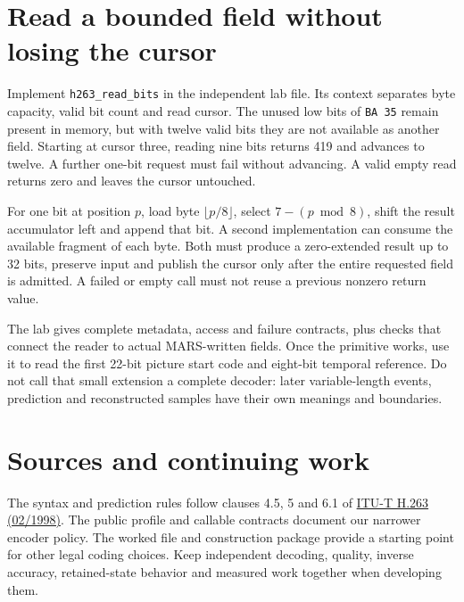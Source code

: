 \section{Read a bounded field without losing the cursor}

Implement \texttt{h263\_read\_bits} in the independent lab file. Its context
separates byte capacity, valid bit count and read cursor. The unused low bits of
\texttt{BA 35} remain present in memory, but with twelve valid bits they are not
available as another field. Starting at cursor three, reading nine bits returns
419 and advances to twelve. A further one-bit request must fail without advancing.
A valid empty read returns zero and leaves the cursor untouched.

For one bit at position $p$, load byte $\lfloor p/8\rfloor$, select
$7-(p\bmod8)$, shift the result accumulator left and append that bit. A second
implementation can consume the available fragment of each byte. Both must produce
a zero-extended result up to 32 bits, preserve input and publish the cursor only
after the entire requested field is admitted. A failed or empty call must not
reuse a previous nonzero return value.

The lab gives complete metadata, access and failure contracts, plus checks that
connect the reader to actual MARS-written fields. Once the primitive works, use
it to read the first 22-bit picture start code and eight-bit temporal reference.
Do not call that small extension a complete decoder: later variable-length events,
prediction and reconstructed samples have their own meanings and boundaries.



\section*{Sources and continuing work}

The syntax and prediction rules follow clauses 4.5, 5 and 6.1 of
\href{https://www.itu.int/rec/T-REC-H.263-199802-S/en}{ITU-T H.263 (02/1998)}.
The public profile and callable contracts document our narrower encoder policy.
The worked file and construction package provide a starting point for other
legal coding choices. Keep independent decoding, quality, inverse accuracy,
retained-state behavior and measured work together when developing them.
